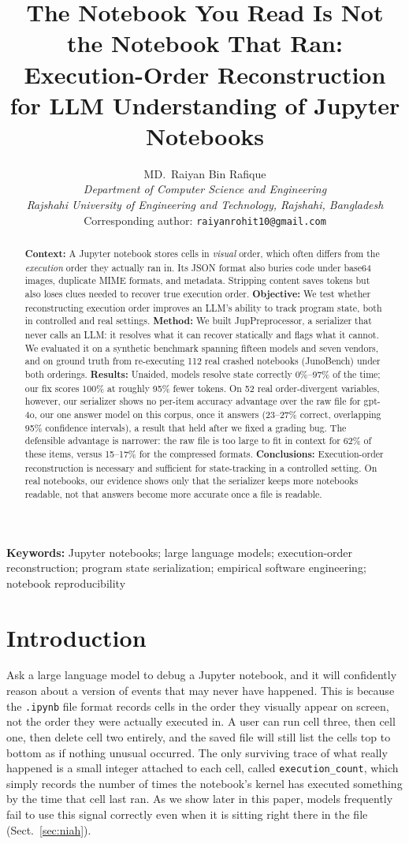 \documentclass[11pt]{article}
\title{The Notebook You Read Is Not the Notebook That Ran:\\
Execution-Order Reconstruction for LLM Understanding of Jupyter Notebooks}
\author{MD.\ Raiyan Bin Rafique \\
\textit{Department of Computer Science and Engineering} \\
\textit{Rajshahi University of Engineering and Technology, Rajshahi, Bangladesh} \\
Corresponding author: \texttt{raiyanrohit10@gmail.com}}
\date{}
\begin{document}
\maketitle

\begin{abstract}
\noindent\textbf{Context:} A Jupyter notebook stores cells in \emph{visual}
order, which often differs from the \emph{execution} order they actually
ran in. Its JSON format also buries code under base64 images, duplicate
MIME formats, and metadata. Stripping content saves tokens but also loses
clues needed to recover true execution order.
\textbf{Objective:} We test whether reconstructing execution order
improves an LLM's ability to track program state, both in controlled and
real settings.
\textbf{Method:} We built JupPreprocessor, a serializer that never calls
an LLM: it resolves what it can recover statically and flags what it
cannot. We evaluated it on a synthetic benchmark spanning fifteen models
and seven vendors, and on ground truth from re-executing 112 real
crashed notebooks (JunoBench) under both orderings.
\textbf{Results:} Unaided, models resolve state correctly 0\%--97\% of the
time; our fix scores 100\% at roughly 95\% fewer tokens.
On 52 real order-divergent variables, however, our serializer shows no
per-item accuracy advantage over the raw file for gpt-4o, our one answer
model on this corpus, once it answers (23--27\% correct, overlapping
95\% confidence intervals), a result that held after we fixed a grading
bug. The defensible advantage is narrower: the raw file is too large to fit
in context for 62\% of these items, versus 15--17\% for the compressed
formats.
\textbf{Conclusions:} Execution-order reconstruction is necessary and
sufficient for state-tracking in a controlled setting. On real notebooks,
our evidence shows only that the serializer keeps more notebooks
readable, not that answers become more accurate once a file is readable.
\end{abstract}

\noindent\textbf{Keywords:} Jupyter notebooks; large language models;
execution-order reconstruction; program state serialization; empirical
software engineering; notebook reproducibility

\section{Introduction}
Ask a large language model to debug a Jupyter notebook, and it will
confidently reason about a version of events that may never have
happened. This is because the \texttt{.ipynb} file format records cells
in the order they visually appear on screen, not the order they were
actually executed in. A user can run cell three, then cell one, then
delete cell two entirely, and the saved file will still list the cells
top to bottom as if nothing unusual occurred. The only surviving trace of
what really happened is a small integer attached to each cell, called
\texttt{execution\_count}, which simply records the number of times the
notebook's kernel has executed something by the time that cell last ran.
As we show later in this paper, models frequently fail to use this signal
correctly even when it is sitting right there in the file
(Sect.~\ref{sec:niah}).
\end{document}
